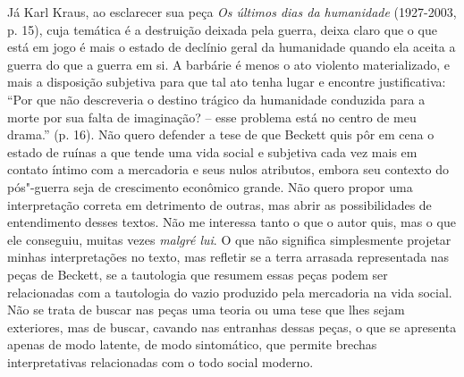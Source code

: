 Já Karl Kraus, ao esclarecer sua peça \emph{Os últimos dias da
humanidade} (1927-2003, p. 15), cuja temática é a destruição deixada
pela guerra, deixa claro que o que está em jogo é mais o estado de
declínio geral da humanidade quando ela aceita a guerra do que a guerra
em si. A barbárie é menos o ato violento materializado, e mais a
disposição subjetiva para que tal ato tenha lugar e encontre
justificativa: ``Por que não descreveria o destino trágico da humanidade
conduzida para a morte por sua falta de imaginação? -- esse problema
está no centro de meu drama.'' (p. 16). Não quero defender a tese de
que Beckett quis pôr em cena o estado de ruínas a que tende uma vida
social e subjetiva cada vez mais em contato íntimo com a mercadoria e
seus nulos atributos, embora seu contexto do pós"-guerra seja de
crescimento econômico grande. Não quero propor uma interpretação
correta em detrimento de outras, mas abrir as possibilidades de
entendimento desses textos. Não me interessa tanto o que o autor quis,
mas o que ele conseguiu, muitas vezes \emph{malgré lui}. O que não
significa simplesmente projetar minhas interpretações no texto, mas
refletir se a terra arrasada representada nas peças de Beckett, se a
tautologia que resumem essas peças podem ser relacionadas com a
tautologia do vazio produzido pela mercadoria na vida social. Não se
trata de buscar nas peças uma teoria ou uma tese que lhes sejam
exteriores, mas de buscar, cavando nas entranhas dessas peças, o que se
apresenta apenas de modo latente, de modo sintomático, que permite
brechas interpretativas relacionadas com o todo social moderno.

